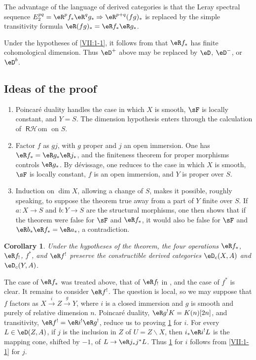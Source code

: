 \documentclass[12pt,oneside,english]{smfbook}
\DeclareMathOperator{\rHom}{\mathsf{R}\mathcal{H}\!om}
\renewcommand{\setminus}{\smallsetminus}
\newtheorem{corollary_}[subsection]{Corollary}
\begin{document}
The advantage of the language of derived categories is that the Leray spectral sequence $E_2^{pq}=\eR^pf_\ast\eR^qg_\ast\Rightarrow \eR^{p+q}(fg)_\ast$ is replaced by the simple transitivity formula $\eR(fg)_\ast=\eR f_\ast\eR g_\ast$.

Under the hypotheses of \ref{VII:1-1}, it follows from \cite{sga4} that $\eR f_\ast$ has finite cohomological dimension. Thus $\eD^+$ above may be replaced by $\eD$, $\eD^-$, or $\eD^b$.

\subsection{Ideas of the proof}\label{VII:1-4}
\begin{enumerate}[\indent a)]
  \item Poincaré duality handles the case in which $X$ is smooth, $\sF$ is locally constant, and $Y=S$. The dimension hypothesis enters through the calculation of $\rHom$ on $S$.
  \item Factor $f$ as $gj$, with $g$ proper and $j$ an open immersion. One has $\eR f_\ast=\eR g_\ast\eR j_\ast$, and the finiteness theorem for proper morphisms controls $\eR g_\ast$. By dévissage, one reduces to the case in which $X$ is smooth, $\sF$ is locally constant, $f$ is an open immersion, and $Y$ is proper over $S$.
  \item Induction on $\dim X$, allowing a change of $S$, makes it possible, roughly speaking, to suppose the theorem true away from a part of $Y$ finite over $S$. If $a:X\to S$ and $b:Y\to S$ are the structural morphisms, one then shows that if the theorem were false for $\sF$ and $\eR f_\ast$, it would also be false for $\sF$ and $\eR b_\ast\eR f_\ast=\eR a_\ast$, a contradiction.
\end{enumerate}

\begin{corollary_}\label{VII:1-5}
Under the hypotheses of the theorem, the four operations $\eR f_\ast$, $\eR f_!$, $f^\ast$, and $\eR f^!$ preserve the constructible derived categories $\eD_c(X,A)$ and $\eD_c(Y,A)$.
\end{corollary_}

The case of $\eR f_\ast$ was treated above, that of $\eR f_!$ in \cite[XVII, 5.3]{sga4}, and the case of $f^\ast$ is clear. It remains to consider $\eR f^!$. The question is local, so we may suppose that $f$ factors as $X\xrightarrow{i}Z\xrightarrow{g}Y$, where $i$ is a closed immersion and $g$ is smooth and purely of relative dimension $n$. Poincaré duality, $\eR g^!K=K(n)[2n]$, and transitivity, $\eR f^!=\eR i^!\eR g^!$, reduce us to proving \ref{VII:1-5} for $i$. For every $L\in\eD(Z,A)$, if $j$ is the inclusion in $Z$ of $U=Z\setminus X$, then $i_\ast\eR i^!L$ is the mapping cone, shifted by $-1$, of $L\to\eR j_\ast j^\ast L$. Thus \ref{VII:1-5} for $i$ follows from \ref{VII:1-1} for $j$.
\end{document}
